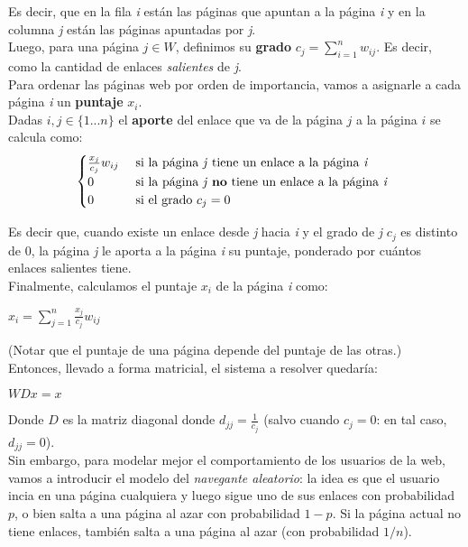 Es decir, que en la fila \textit{i} están las páginas que apuntan a la página \textit{i} y en la columna \textit{j} están las páginas apuntadas por \textit{j}. \\

Luego, para una página $j \in W$, definimos su \textbf{grado} $c_{j} = \sum_{i = 1}^{n} w_{ij}$. Es decir, como la cantidad de enlaces \textit{salientes} de \textit{j}. \\

Para ordenar las páginas web por orden de importancia, vamos a asignarle a cada página \textit{i} un \textbf{puntaje} $x_i$. \\

Dadas $i, j \in \{1...n\}$ el \textbf{aporte} del enlace que va de la página $j$ a la página $i$ se calcula como: \\

\[
	\begin{cases}
		\frac{x_j}{c_j}w_{ij} 	& \text{ si la página \textit{j} tiene un enlace a la página \textit{i} } \\
		0 			& \text{ si la página \textit{j} \textbf{no} tiene un enlace a la página \textit{i} } \\
		0 			& \text{ si el grado $c_j = 0$}
	\end{cases}
\]

Es decir que, cuando existe un enlace desde \textit{j} hacia \textit{i} y el grado de \textit{j} $c_j$ es distinto de $0$, la página \textit{j} le aporta a la página \textit{i} su puntaje, ponderado por cuántos enlaces salientes tiene. \\

Finalmente, calculamos el puntaje $x_i$ de la página \textit{i} como:

$ x_i = \sum_{j=1}^{n} \frac{x_j}{c_j} w_{ij} $

(Notar que el puntaje de una página depende del puntaje de las otras.) \\

Entonces, llevado a forma matricial, el sistema a resolver quedaría:

$WDx = x$

Donde $D$ es la matriz diagonal donde $d_{jj} = \frac{1}{c_j}$ (salvo cuando $c_j = 0$: en tal caso, $d_{jj} = 0$). \\

Sin embargo, para modelar mejor el comportamiento de los usuarios de la web, vamos a introducir el modelo del \textit{navegante aleatorio}: la idea es que el usuario incia en una página cualquiera y luego sigue uno de sus enlaces con probabilidad $p$, o bien salta a una página al azar con probabilidad $1 - p$. Si la página actual no tiene enlaces, también salta a una página al azar (con probabilidad $1/n$). \\


